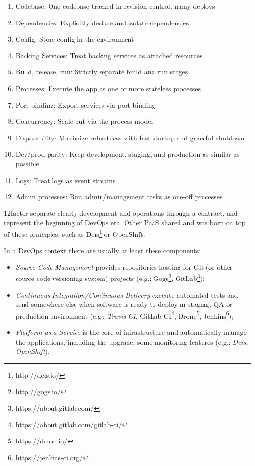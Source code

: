 \begin{enumerate}
\item Codebase:  One codebase tracked in revision control, many deploys
\item Dependencies:  Explicitly declare and isolate dependencies
\item Config: Store config in the environment
\item Backing Services:  Treat backing services as attached resources
\item Build, release, run:  Strictly separate build and run stages
\item Processes:  Execute the app as one or more stateless processes
\item Port binding:  Export services via port binding
\item Concurrency:  Scale out via the process model
\item Disposability:  Maximize robustness with fast startup and graceful shutdown
\item Dev/prod parity:  Keep development, staging, and production as similar as possible
\item Logs:  Treat logs as event streams
\item Admin processes:  Run admin/management tasks as one-off processes
\end{enumerate}

12factor separate clearly development and operations through a contract, and represent the beginning of DevOps\cite{Adopting DevOps Practices in Quality Assurance} era. Other PaaS shared and was born on top of these principles, such as Deis\footnote{http://deis.io/} or OpenShift.

In a DevOps context there are usually at least these components:

\begin{itemize}
\item \textit{Source Code Management} provides repositories hosting for Git   (or other source code versioning system) projects (e.g.: Gogs\footnote{http://gogs.io/},   GitLab\footnote{https://about.gitlab.com/});
\item \textit{Continuous Integration/Continuous Delivery} execute automated   tests and send somewhere else when software is ready to deploy in   staging, QA or production environment (e.g.: \textit{Travis CI},  GitLab CI\footnote{https://about.gitlab.com/gitlab-ci/}, Drone\footnote{https://drone.io/}, Jenkins\footnote{https://jenkins-ci.org/});
\item \textit{Platform as a Service} is the core of infrastructure and
  automatically manage the applications, including the upgrade, some
  monitoring features (e.g.: \textit{Deis}, \textit{OpenShift}).
\end{itemize}

